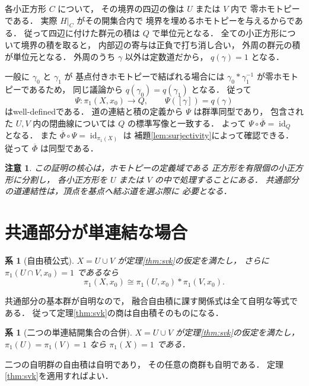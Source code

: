 \documentclass[a5paper,10pt,onecolumn]{jsarticle}
\makeatletter
\theoremstyle{mathnotetheorem}
\newtheorem{corollary}[theorem]{系}
\newtheorem{remark}[theorem]{注意}
\renewcommand{\proofname}{証明}
\renewenvironment{proof}[1][\proofname]{%
  \par\pushQED{\qed}\normalfont\topsep4\p@\@plus2\p@\relax
  \trivlist\item[\hskip\labelsep\bfseries #1]\ignorespaces
}{\popQED\endtrivlist\@endpefalse}
\makeatother
\begin{document}
\begin{proof}
各小正方形 $C$ について，
その境界の四辺の像は $U$ または $V$ 内で
零ホモトピーである．
実際 $H|_C$ がその開集合内で
境界を埋めるホモトピーを与えるからである．
従って四辺に付けた群元の積は $Q$ で単位元となる．
全ての小正方形について境界の積を取ると，
内部辺の寄与は正負で打ち消し合い，
外周の群元の積が単位元となる．
外周のうち $\gamma$ 以外は定数道だから，
$q(\gamma)=1$ となる．

一般に $\gamma_0$ と $\gamma_1$ が
基点付きホモトピーで結ばれる場合には
$\gamma_0*\gamma_1^{-1}$ が零ホモトピーであるため，
同じ議論から $q(\gamma_0)=q(\gamma_1)$ となる．
従って
\[
 \Psi:\pi_1(X,x_0)\to Q,\qquad
 \Psi([\gamma])=q(\gamma)
\]
はwell-definedである．
道の連結と積の定義から $\Psi$ は群準同型であり，
包含された $U,V$ 内の閉曲線については
$Q$ の標準写像と一致する．
よって $\Psi\circ\overline\Phi=\operatorname{id}_Q$ となる．
また $\overline\Phi\circ\Psi=\operatorname{id}_{\pi_1(X)}$ は
補題\ref{lem:surjectivity}によって確認できる．
従って $\overline\Phi$ は同型である．
\end{proof}

\begin{remark}
この証明の核心は，ホモトピーの定義域である
正方形を有限個の小正方形に分割し，
各小正方形を $U$ または $V$ の中で処理することにある．
共通部分の道連結性は，頂点を基点へ結ぶ道を選ぶ際に
必要となる．
\end{remark}

\section{共通部分が単連結な場合}

\begin{corollary}[自由積公式]\label{cor:free-prod}
$X=U\cup V$ が定理\ref{thm:svk}の仮定を満たし，
さらに $\pi_1(U\cap V,x_0)=1$ であるなら
\[
 \pi_1(X,x_0)\cong
 \pi_1(U,x_0)*\pi_1(V,x_0).
\]
\end{corollary}
\begin{proof}
共通部分の基本群が自明なので，
融合自由積に課す関係式は全て自明な等式である．
従って定理\ref{thm:svk}の商は自由積そのものになる．
\end{proof}

\begin{corollary}[二つの単連結開集合の合併]\label{cor:simply}
$X=U\cup V$ が定理\ref{thm:svk}の仮定を満たし，
$\pi_1(U)=\pi_1(V)=1$ なら
$\pi_1(X)=1$ である．
\end{corollary}
\begin{proof}
二つの自明群の自由積は自明であり，
その任意の商群も自明である．
定理\ref{thm:svk}を適用すればよい．
\end{proof}
\end{document}
